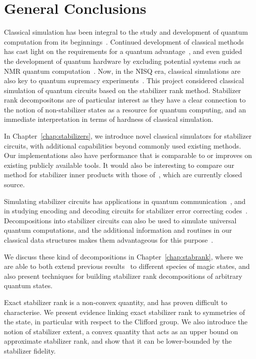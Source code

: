 
\chapter{General Conclusions}
\label{chap:conclusion}
Classical simulation has been integral to the study and development of quantum computation from its beginnings~\cite{Feynman1982}. Continued development of classical methods has cast light on the requirements for a quantum advantage~\cite{Jozsa2003}, and even guided the development of quantum hardware by excluding potential systems such as NMR quantum computation~\cite{Braunstein1999}. Now, in the NISQ era, classical simulations are also key to quantum supremacy experiments~\cite{Preskill2012,Aaronson2016}. This project considered classical simulation of quantum circuits based on the stabilizer rank method. Stabilizer rank decompositons are of particular interest as they have a clear connection to the notion of non-stabilizer states as a resource for quantum computing, and an immediate interpretation in terms of hardness of classical simulation.\par
In Chapter~\ref{chap:stabilizers}, we introduce novel classical simulators for stabilizer circuits, with additional capabilities beyond commonly used existing methods. Our implementations also have performance that is comparable to or improves on existing publicly available tools. It would also be interesting to compare our method for stabilizer inner products with those of~\cite{Garcia2012}, which are currently closed source.\par
Simulating stabilizer circuits has applications in quantum communication~\cite{Bennett1992,Bennett1993}, and in studying encoding and decoding circuits for stabilizer error correcting codes~\cite{Aaronson2004,Gottesman1997}. Decompositions into stabilizer circuits can also be used to simulate universal quantum computations, and the additional information and routines in our classical data structures makes them advantageous for this purpose~\cite{Bravyi2018}.\par
We discuss these kind of decompositions in Chapter~\ref{chap:stabrank}, where we are able to both extend previous results~\cite{Bravyi2016,Bravyi2015} to different species of magic states, and also present techniques for building stabilizer rank decompositions of arbitrary quantum states.\par
Exact stabilizer rank is a non-convex quantity, and has proven difficult to characterise. We present evidence linking exact stabilizer rank to symmetries of the state, in particular with respect to the Clifford group. We also introduce the notion of stabilizer extent, a convex quantity that acts as an upper bound on approximate stabilizer rank, and show that it can be lower-bounded by the stabilizer fidelity.\par
